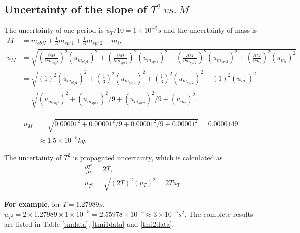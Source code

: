 \subsection{Uncertainty of the slope of $T^2\ vs.\ M$}
    The uncertainty of one period is $u_T/10=1\times10^{-5}s$ and the uncertainty of mass is
    \[
    \begin{split}
        M&=m_{objI}+\frac{1}{3}m_{spr1}+\frac{1}{3}m_{spr2}+m_i,\\
        u_M&=\sqrt{
         (\frac{\partial M}{\partial m_{objI}})^2(u_{m_{objI}})^2
        +(\frac{\partial M}{\partial m_{spr1}})^2(u_{m_{spr1}})^2
        +(\frac{\partial M}{\partial m_{spr2}})^2(u_{m_{spr2}})^2
        +(\frac{\partial M}{\partial m_i})^2(u_{m_i})^2
        }\\
        &=\sqrt{
         (1)^2(u_{m_{objI}})^2
        +(\frac{1}{3})^2(u_{m_{spr1}})^2
        +(\frac{1}{3})^2(u_{m_{spr2}})^2
        +(1)^2(u_{m_i})^2
        }\\
        &=\sqrt{(u_{m_{objI}})^2+(u_{m_{spr1}})^2/9+(u_{m_{spr2}})^2/9+(u_{m_i})^2}.
    \end{split}
    \]

    \[
    \begin{split}
        u_M&=\sqrt{0.00001^2+0.00001^2/9+0.00001^2/9+0.00001^2}=0.0000149\\
        &\approx 1.5\times10^{-5}kg.
    \end{split}
    \]

    The uncertainty of $T^2$ is propagated uncertainty, which is calculated as
    \[
    \begin{split}
        &\frac{\partial T^2}{\partial T}=2T,\\
        &u_{T^2}=\sqrt{(2T)^2(u_T)^2}=2Tu_T.
    \end{split}
    \]

    \textbf{For example}, for $T=1.27989s$, $u_{T^2}=2\times1.27989\times1\times10^{-5}=2.55978\times10^{-5}\approx3\times10^{-5}s^2$. The complete results are listed in Table \ref{tmdata}, \ref{tmi1data} and \ref{tmi2data}.

